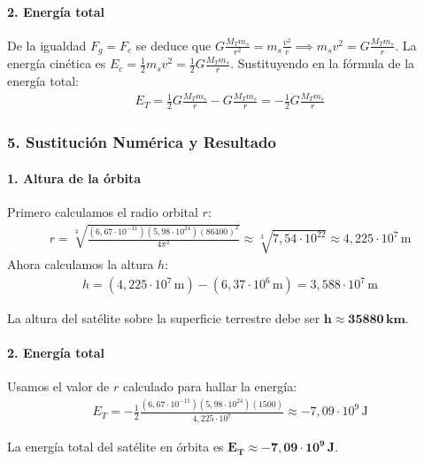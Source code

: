\paragraph{2. Energía total}
De la igualdad $F_g = F_c$ se deduce que $G \frac{M_T m_s}{r^2} = m_s \frac{v^2}{r} \implies m_s v^2 = G\frac{M_T m_s}{r}$. La energía cinética es $E_c = \frac{1}{2} m_s v^2 = \frac{1}{2} G\frac{M_T m_s}{r}$.
Sustituyendo en la fórmula de la energía total:
\begin{gather}
    E_T = \frac{1}{2} G\frac{M_T m_s}{r} - G\frac{M_T m_s}{r} = -\frac{1}{2} G\frac{M_T m_s}{r}
\end{gather}

\subsubsection*{5. Sustitución Numérica y Resultado}
\paragraph{1. Altura de la órbita}
Primero calculamos el radio orbital $r$:
\begin{gather}
    r = \sqrt[3]{\frac{(6,67 \cdot 10^{-11})(5,98 \cdot 10^{24})(86400)^2}{4\pi^2}} \approx \sqrt[3]{7,54 \cdot 10^{22}} \approx 4,225 \cdot 10^7 \, \text{m}
\end{gather}
Ahora calculamos la altura $h$:
\begin{gather}
    h = (4,225 \cdot 10^7 \, \text{m}) - (6,37 \cdot 10^6 \, \text{m}) = 3,588 \cdot 10^7 \, \text{m}
\end{gather}
\begin{cajaresultado}
    La altura del satélite sobre la superficie terrestre debe ser $\boldsymbol{h \approx 35880 \, \textbf{km}}$.
\end{cajaresultado}

\paragraph{2. Energía total}
Usamos el valor de $r$ calculado para hallar la energía:
\begin{gather}
    E_T = -\frac{1}{2} \frac{(6,67 \cdot 10^{-11})(5,98 \cdot 10^{24})(1500)}{4,225 \cdot 10^7} \approx -7,09 \cdot 10^9 \, \text{J}
\end{gather}
\begin{cajaresultado}
    La energía total del satélite en órbita es $\boldsymbol{E_T \approx -7,09 \cdot 10^9 \, \textbf{J}}$.
\end{cajaresultado}

